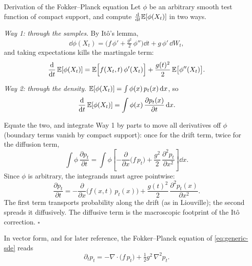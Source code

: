\begin{toolbox}{Derivation of the Fokker--Planck equation}
Let $\phi$ be an arbitrary smooth test function of compact support, and
compute $\frac{\mathrm{d}}{\mathrm{d} t}\mathbb{E}[\phi(X_t)]$ in two ways.

\emph{Way 1: through the samples.} By It\^o's lemma,
\begin{equation*}
  \dd \phi(X_t)
  = \Big( f\,\phi' + \tfrac{g^2}{2}\,\phi'' \Big)\dd t
  + g\,\phi'\,\dd W_t ,
\end{equation*}
and taking expectations kills the martingale term:
\begin{equation*}
  \frac{\mathrm{d}}{\mathrm{d} t}\,\mathbb{E}[\phi(X_t)]
  = \mathbb{E}\Big[ f(X_t,t)\,\phi'(X_t) \Big]
  + \frac{g(t)^2}{2}\, \mathbb{E}\big[ \phi''(X_t) \big] .
\end{equation*}

\emph{Way 2: through the density.}
$\mathbb{E}[\phi(X_t)] = \int \phi(x)\, p_t(x)\,\mathrm{d} x$, so
\begin{equation*}
  \frac{\mathrm{d}}{\mathrm{d} t}\,\mathbb{E}[\phi(X_t)]
  = \int \phi(x)\, \frac{\partial p_t(x)}{\partial t}\, \mathrm{d} x .
\end{equation*}

Equate the two, and integrate Way 1 by parts to move all derivatives off
$\phi$ (boundary terms vanish by compact support): once for the drift
term, twice for the diffusion term,
\begin{equation*}
  \int \phi\, \frac{\partial p_t}{\partial t}
  = \int \phi \left[
      -\frac{\partial}{\partial x}\big( f\, p_t \big)
      + \frac{g^2}{2}\, \frac{\partial^2 p_t}{\partial x^2}
    \right] \dd x .
\end{equation*}
Since $\phi$ is arbitrary, the integrands must agree pointwise:
\begin{equation*}
  \boxed{\;
  \frac{\partial p_t}{\partial t}
  = -\frac{\partial}{\partial x}\big( f(x,t)\, p_t(x) \big)
  + \frac{g(t)^2}{2}\, \frac{\partial^2 p_t(x)}{\partial x^2} .
  \;}
\end{equation*}
The first term transports probability along the drift (as in Liouville);
the second spreads it diffusively. The diffusive term is the macroscopic
footprint of the It\^o correction. \hfill$\square$
\end{toolbox}

In vector form, and for later reference, the Fokker--Planck equation of
\eqref{eq:generic-sde} reads
\begin{equation}
  \partial_t p_t = -\nabla \cdot \big( f\, p_t \big)
  + \tfrac{1}{2} g^2\, \nabla^2 p_t .
  \label{eq:fokker-planck}
\end{equation}

